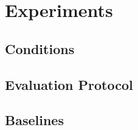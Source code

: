 \section{Experiments}
\label{sec:experiments}


\subsection{Conditions}
%

\subsection{Evaluation Protocol}

\subsection{Baselines}

